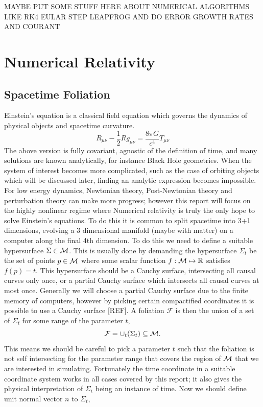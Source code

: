 




MAYBE PUT SOME STUFF HERE ABOUT NUMERICAL ALGORITHMS LIKE RK4 EULAR STEP LEAPFROG AND DO ERROR GROWTH RATES AND COURANT


\section{Numerical Relativity}\label{nr:sec:nr} 
\subsection{Spacetime Foliation}
Einstein's equation is a classical field equation which governs the dynamics of physical objects and spacetime curvature. 
\begin{equation}\label{nr:eq:einstein}R_{\mu\nu} - \frac{1}{2} Rg_{\mu\nu} = \frac{8\pi G}{c^4}T_{\mu\nu}\end{equation}
The above version is fully covariant, agnostic of the definition of time, and many solutions are known analytically, for instance Black Hole geometries. When the system of interest becomes more complicated, such as the case of orbiting objects which will be discussed later, finding an analytic expression becomes impossible. For low energy dynamics, Newtonian theory, Post-Newtonian theory and perturbation theory can make more progress; however this report will focus on the highly nonlinear regime where Numerical relativity is truly the only hope to solve Einstein's equations. To do this it is common to split spacetime into 3+1 dimensions, evolving a 3 dimensional manifold (maybe with matter) on a computer along the final 4th dimension. To do this we need to define a suitable hypersurface $\Sigma \in \mathcal{M}$. This is usually done by demanding the hypersurface $\Sigma_t$ be the set of points $p \in \mathcal{M}$ where some scalar function $f:\mathcal{M}\mapsto \mathbb{R}$ satisfies $f(p)=t$. This hypersurface should be a Cauchy surface, intersecting all causal curves only once, or a partial Cauchy surface which intersects all causal curves at most once. Generally we will choose a partial Cauchy surface due to the finite memory of computers, however by picking certain compactified coordinates it is possible to use a Cauchy surface [REF]. A foliation $\mathcal{F}$ is then the union of a set of $\Sigma_t$ for some range of the parameter $t$,
\begin{equation}\mathcal{F} = \cup_t(\Sigma_t) \subseteq \mathcal{M}.\end{equation}
This means we should be careful to pick a parameter $t$ such that the foliation is not self intersecting for the parameter range that covers the region of $\mathcal{M}$ that we are interested in simulating. Fortunately the time coordinate in a suitable coordinate system works in all cases covered by this report; it also gives the physical interpretation of $\Sigma_t$ being an instance of time. Now we should define unit normal vector $n$ to $\Sigma_t$,
